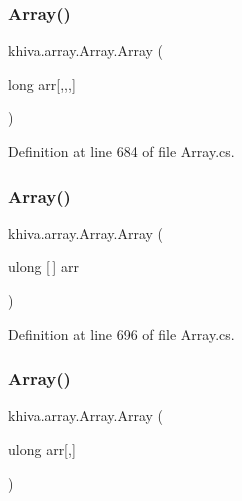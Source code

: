 \subsubsection{\texorpdfstring{Array()}{Array()}\hspace{0.1cm}{\footnotesize\ttfamily [32/46]}}
{\footnotesize\ttfamily khiva.\+array.\+Array.\+Array (\begin{DoxyParamCaption}\item[{long}]{arr\mbox{[},,,\mbox{]} }\end{DoxyParamCaption})\hspace{0.3cm}{\ttfamily [inline]}}



Definition at line 684 of file Array.\+cs.

\mbox{\label{classkhiva_1_1array_1_1_array_a9165cefcfa229876cd5435cc2f93b7f0}} 
\subsubsection{\texorpdfstring{Array()}{Array()}\hspace{0.1cm}{\footnotesize\ttfamily [33/46]}}
{\footnotesize\ttfamily khiva.\+array.\+Array.\+Array (\begin{DoxyParamCaption}\item[{ulong \mbox{[}$\,$\mbox{]}}]{arr }\end{DoxyParamCaption})\hspace{0.3cm}{\ttfamily [inline]}}



Definition at line 696 of file Array.\+cs.

\mbox{\label{classkhiva_1_1array_1_1_array_aea1a9e3cdb0551a5f9266668c1b7dd66}} 
\subsubsection{\texorpdfstring{Array()}{Array()}\hspace{0.1cm}{\footnotesize\ttfamily [34/46]}}
{\footnotesize\ttfamily khiva.\+array.\+Array.\+Array (\begin{DoxyParamCaption}\item[{ulong}]{arr\mbox{[},\mbox{]} }\end{DoxyParamCaption})\hspace{0.3cm}{\ttfamily [inline]}}



